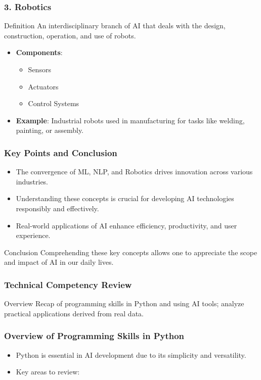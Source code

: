 \documentclass[aspectratio=169]{beamer}
\begin{document}
\begin{frame}[fragile]
    \frametitle{3. Robotics}
    \begin{block}{Definition}
        An interdisciplinary branch of AI that deals with the design, construction, operation, and use of robots.
    \end{block}
    \begin{itemize}
        \item \textbf{Components}:
        \begin{itemize}
            \item Sensors
            \item Actuators
            \item Control Systems
        \end{itemize}
        \item \textbf{Example}: Industrial robots used in manufacturing for tasks like welding, painting, or assembly.
    \end{itemize}
\end{frame}

\begin{frame}[fragile]
    \frametitle{Key Points and Conclusion}
    \begin{itemize}
        \item The convergence of ML, NLP, and Robotics drives innovation across various industries.
        \item Understanding these concepts is crucial for developing AI technologies responsibly and effectively.
        \item Real-world applications of AI enhance efficiency, productivity, and user experience.
    \end{itemize}
    \begin{block}{Conclusion}
        Comprehending these key concepts allows one to appreciate the scope and impact of AI in our daily lives.
    \end{block}
\end{frame}

\begin{frame}
    \frametitle{Technical Competency Review}
    \begin{block}{Overview}
        Recap of programming skills in Python and using AI tools; analyze practical applications derived from real data.
    \end{block}
\end{frame}

\begin{frame}[fragile]
    \frametitle{Overview of Programming Skills in Python}
    \begin{itemize}
        \item Python is essential in AI development due to its simplicity and versatility.
        \item Key areas to review:
    \end{itemize}
\end{frame}
\end{document}
